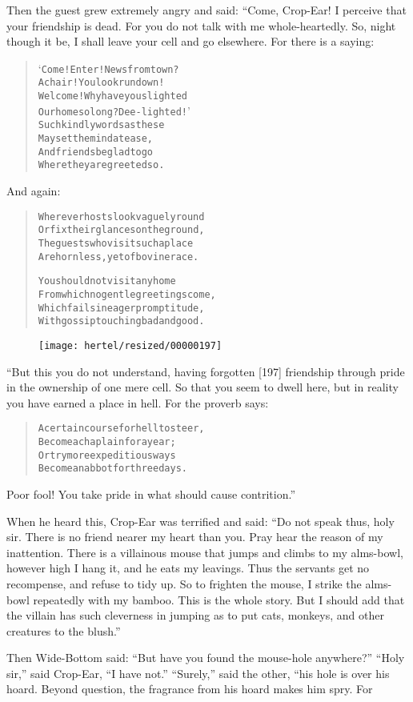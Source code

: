 \documentclass[article, twoside, 10pt]{memoir}
\renewenvironment{verbatim}{%
\begin{quote}%
\vskip -10pt%
\begin{alltt}\normalfont\small}{\end{alltt}%
\end{quote}%
\vskip -10pt
} %
\begin{document}
Then the guest grew extremely angry and said: “Come, Crop-Ear! I
perceive that your friendship is dead. For you do not talk with me
whole-heartedly. So, night though it be, I shall leave your cell
and go elsewhere. For there is a saying:

\begin{verbatim}
‘Come! Enter! News from town?
A chair! You look run down!
Welcome! Why have you slighted
Our home so long? Dee-lighted!’
Such kindly words as these
May set the mind at ease,
And friends be glad to go
Where they are greeted so.
\end{verbatim}
And again:

\begin{verbatim}
Wherever hosts look vaguely round
Or fix their glances on the ground,
The guests who visit such a place
Are hornless, yet of bovine race.

You should not visit any home
From which no gentle greetings come,
Which fails in eager promptitude,
With gossip touching bad and good.
\end{verbatim}
\begin{figure}[p]\texttt{[image: hertel/resized/00000197]}\end{figure}“But this you do not understand, having forgotten [197] friendship
through pride in the ownership of one mere cell. So that you seem
to dwell here, but in reality you have earned a place in hell. For
the proverb says:

\begin{verbatim}
A certain course for hell to steer,
Become a chaplain for a year;
Or try more expeditious ways{\textemdash}
Become an abbot for three days.
\end{verbatim}
Poor fool! You take pride in what should cause contrition.”

When he heard this, Crop-Ear was terrified and said:
``Do not speak thus, holy sir. There is no friend nearer my heart than you. Pray hear the reason of my inattention. There is a villainous mouse that jumps and climbs to my alms-bowl, however high I hang it, and he eats my leavings. Thus the servants get no recompense, and refuse to tidy up. So to frighten the mouse, I strike the alms-bowl repeatedly with my bamboo. This is the whole story. But I should add that the villain has such cleverness in jumping as to put cats, monkeys, and other creatures to the blush.''

Then Wide-Bottom said:
``But have you found the mouse-hole anywhere?'' ``Holy sir,'' said
Crop-Ear, ``I have not.'' ``Surely,'' said the other, “his hole is
over his hoard. Beyond question, the fragrance from his hoard makes
him spry. For
\end{document}
